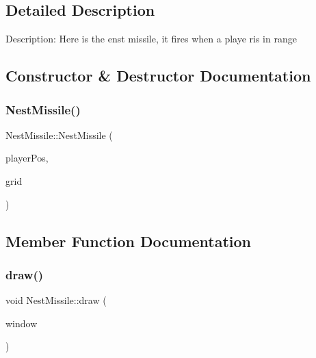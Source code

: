 \subsection{Detailed Description}
Description\+: Here is the enst missile, it fires when a playe ris in range 

\subsection{Constructor \& Destructor Documentation}
\mbox{\label{class_nest_missile_a247f13ab901201350105cd06c42cf4bc}} 
\subsubsection{\texorpdfstring{NestMissile()}{NestMissile()}}
{\footnotesize\ttfamily Nest\+Missile\+::\+Nest\+Missile (\begin{DoxyParamCaption}\item[{\mbox{\hyperlink{class_vector2f}{Vector2f}} \&}]{player\+Pos,  }\item[{\mbox{\hyperlink{class_grid}{Grid}} $\ast$}]{grid }\end{DoxyParamCaption})}



\subsection{Member Function Documentation}
\mbox{\label{class_nest_missile_af858a9e01982e6e10c2745c31718a611}} 
\subsubsection{\texorpdfstring{draw()}{draw()}}
{\footnotesize\ttfamily void Nest\+Missile\+::draw (\begin{DoxyParamCaption}\item[{sf\+::\+Render\+Window \&}]{window }\end{DoxyParamCaption})}

\mbox{\label{class_nest_missile_a8594c06cd3421068518862e155dd07f8}} 
